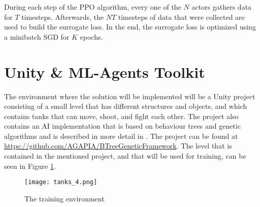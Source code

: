 

During each step of the PPO algorithm, every one of the $N$ actors gathers data for $T$ timesteps. Afterwards, the $NT$ timesteps of data that were collected are used to build the surrogate loss. In the end, the surrogate loss is optimized using a minibatch SGD for $K$ epochs.


\section{Unity \& ML-Agents Toolkit}

The environment where the solution will be implemented will be a Unity project consisting of a small level that has different structures and objects, and which contains tanks that can move, shoot, and fight each other. The project also contains an AI implementation that is based on behaviour trees and genetic algorithms and is described in more detail in \cite{paduraru2019automatic}. The project can be found at \url{https://github.com/AGAPIA/BTreeGeneticFramework}. The level that is contained in the mentioned project, and that will be used for training, can be seen in Figure \ref{photo:tank_training_env}.

\begin{figure}
    \begin{center}
        \texttt{[image: tanks\_4.png]}
        \caption{The training environment}
        \label{photo:tank_training_env}
    \end{center}
\end{figure}

